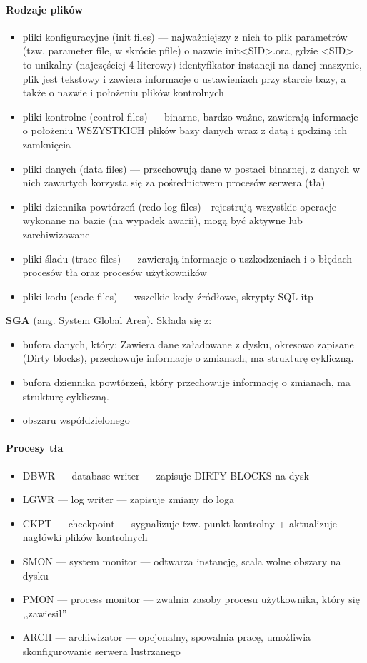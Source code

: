 \documentclass[]{report}
\begin{document}
\medskip 
\paragraph{Rodzaje plików}

\begin{itemize}
\item pliki konfiguracyjne (init files) — najważniejszy z nich to plik parametrów (tzw. parameter file, w skrócie pfile) o nazwie init<SID>.ora, gdzie <SID> to unikalny (najczęściej 4-literowy) identyfikator instancji na danej maszynie, plik jest tekstowy i zawiera informacje o ustawieniach przy starcie bazy, a także o nazwie i położeniu plików kontrolnych
\item pliki kontrolne (control files) — binarne, bardzo ważne, zawierają informacje o położeniu WSZYSTKICH plików bazy danych wraz z datą i godziną ich zamknięcia
\item pliki danych (data files) — przechowują dane w postaci binarnej, z danych w nich zawartych korzysta się za pośrednictwem procesów serwera (tła)
\item  pliki dziennika powtórzeń (redo-log files) - rejestrują wszystkie operacje wykonane na bazie (na wypadek awarii), mogą być aktywne lub zarchiwizowane 
\item pliki śladu (trace files) — zawierają informacje o uszkodzeniach i o błędach procesów tła oraz procesów użytkowników
\item pliki kodu (code files) — wszelkie kody źródłowe, skrypty SQL itp 
\end{itemize}


\textbf{SGA} (ang. System Global Area). 
Składa się z:
\begin{itemize}
\item bufora danych, który:
Zawiera dane załadowane z dysku, okresowo zapisane (Dirty blocks), przechowuje informacje o zmianach, ma strukturę cykliczną.
\item bufora dziennika powtórzeń, który przechowuje informację o zmianach, ma strukturę cykliczną.
\item obszaru współdzielonego
\end{itemize}

\paragraph{Procesy tła}
\begin{itemize}
\item DBWR — database writer — zapisuje DIRTY BLOCKS na dysk 
\item LGWR — log writer — zapisuje zmiany do loga
\item CKPT — checkpoint — sygnalizuje tzw. punkt kontrolny + aktualizuje nagłówki plików kontrolnych
\item SMON — system monitor — odtwarza instancję, scala wolne obszary na dysku
\item PMON — process monitor — zwalnia zasoby procesu użytkownika, który się ,,zawiesił''
\item ARCH — archiwizator — opcjonalny, spowalnia pracę, umożliwia skonfigurowanie serwera lustrzanego
\end{itemize}
\end{document}
